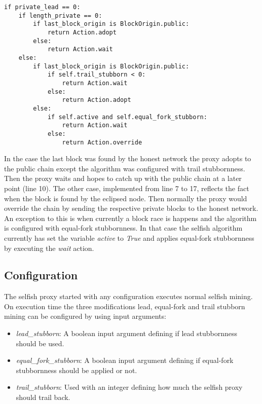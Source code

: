 \begin{minipage}{\linewidth}
\begin{lstlisting}[caption=Part of the selfish mining algorithm where private lead is zero, label={lst:algo}, basicstyle=\ttfamily, captionpos=b]
if private_lead == 0:
    if length_private == 0:
        if last_block_origin is BlockOrigin.public:
            return Action.adopt
        else:
            return Action.wait
    else:
        if last_block_origin is BlockOrigin.public:
            if self.trail_stubborn < 0:
                return Action.wait
            else:
                return Action.adopt
        else:
            if self.active and self.equal_fork_stubborn:
                return Action.wait
            else:
                return Action.override
\end{lstlisting}
\end{minipage}

In the case the last block was found by the honest network the proxy adopts to the public chain except the algorithm was configured with trail stubbornness.
Then the proxy waits and hopes to catch up with the public chain at a later point (line 10).
The other case, implemented from line 7 to 17, reflects the fact when the block is found by the eclipsed node.
Then normally the proxy would override the chain by sending the respective private blocks to the honest network.
An exception to this is when currently a block race is happens and the algorithm is configured with equal-fork stubbornness.
In that case the selfish algorithm currently has set the variable \textit{active} to \textit{True} and applies equal-fork stubbornness by executing the \textit{wait} action.

\subsection{Configuration}

The selfish proxy started with any configuration executes normal selfish mining.
On execution time the three modifications lead, equal-fork and trail stubborn mining can be configured by using input arguments:

\begin{itemize}
	\item \textit{lead\_stubborn}:
	A boolean input argument defining if lead stubbornness should be used. 
	\item \textit{equal\_fork\_stubborn}:
	A boolean input argument defining if equal-fork stubbornness should be applied or not.
	\item \textit{trail\_stubborn}:
	Used with an integer defining how much the selfish proxy should trail back.
\end{itemize}
